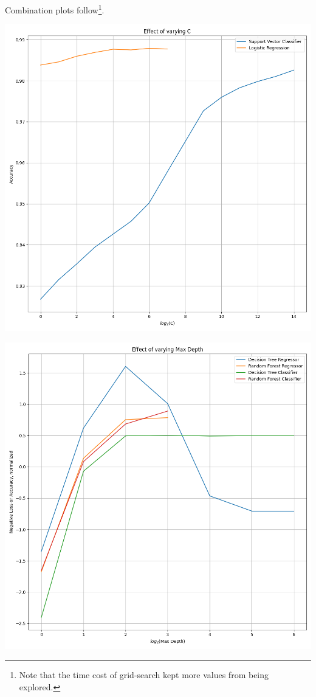 \documentclass[12pt, letterpaper]{article}
\begin{document}
Combination plots follow\footnote{
Note that the time cost of grid-search kept more values from being explored.
}.

\includegraphics[scale=\myscale]{combo_C.png}

\includegraphics[scale=\myscale]{combo_max_depth.png}
\end{document}
